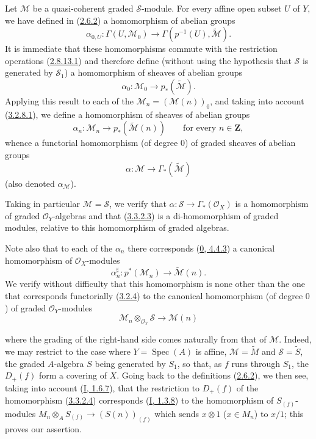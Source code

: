\begin{env}[3.3.2]
\label{II.3.3.2}
Let $\mathcal{M}$ be a quasi-coherent graded $\mathcal{S}$-module. For every
affine open subset $U$ of $Y$, we have defined in
(\hyperref[II.2.6.2]{2.6.2}) a homomorphism of abelian groups
\[
  \alpha_{0,U}:\Gamma(U,\mathcal{M}_0)
  \longrightarrow\Gamma(p^{-1}(U),\widetilde{\mathcal{M}}).
\]
It is immediate that these homomorphisms commute with the restriction
operations (\hyperref[II.2.8.13.1]{2.8.13.1}) and therefore define
(without using the hypothesis that $\mathcal{S}$ is generated by
$\mathcal{S}_1$) a homomorphism of sheaves of abelian groups
\[
\label{II.3.3.2.1}
  \alpha_0:\mathcal{M}_0\longrightarrow p_*(\widetilde{\mathcal{M}}).
\tag{3.3.2.1}
\]
Applying this result to each of the
$\mathcal{M}_n=(\mathcal{M}(n))_0$, and taking into account
(\hyperref[II.3.2.8.1]{3.2.8.1}), we define a homomorphism of sheaves of
abelian groups
\[
\label{II.3.3.2.2}
  \alpha_n:\mathcal{M}_n\longrightarrow
  p_*(\widetilde{\mathcal{M}}(n))
  \qquad\text{for every }n\in\mathbf{Z},
\tag{3.3.2.2}
\]
whence a functorial homomorphism (of degree $0$) of graded sheaves of abelian
groups
\[
\label{II.3.3.2.3}
  \alpha:\mathcal{M}\longrightarrow\Gamma_*(\widetilde{\mathcal{M}})
\tag{3.3.2.3}
\]
(also denoted $\alpha_{\mathcal{M}}$).

Taking in particular $\mathcal{M}=\mathcal{S}$, we verify that
$\alpha:\mathcal{S}\to\Gamma_*(\mathcal{O}_X)$ is a homomorphism of graded
$\mathcal{O}_Y$-algebras and that
(\hyperref[II.3.3.2.3]{3.3.2.3}) is a di-homomorphism of graded modules,
relative to this homomorphism of graded algebras.

Note also that to each of the $\alpha_n$ there corresponds
(\hyperref[0.4.4.3]{0, 4.4.3}) a canonical homomorphism of
$\mathcal{O}_X$-modules
\[
\label{II.3.3.2.4}
  \alpha_n^\sharp:p^*(\mathcal{M}_n)
  \longrightarrow\widetilde{\mathcal{M}}(n).
\tag{3.3.2.4}
\]
We verify without difficulty that this homomorphism is none other than the
one that corresponds functorially (\hyperref[II.3.2.4]{3.2.4}) to the
canonical homomorphism (of degree $0$) of graded $\mathcal{O}_Y$-modules
\[
\label{II.3.3.2.5}
  \mathcal{M}_n\otimes_{\mathcal{O}_Y}\mathcal{S}
  \longrightarrow\mathcal{M}(n)
\tag{3.3.2.5}
\]


where the grading of the right-hand side comes naturally from that of
$\mathcal{M}$. Indeed, we may restrict to the case where
$Y=\operatorname{Spec}(A)$ is affine, $\mathcal{M}=\widetilde{M}$ and
$\mathcal{S}=\widetilde{S}$, the graded $A$-algebra $S$ being generated by
$S_1$, so that, as $f$ runs through $S_1$, the $D_+(f)$ form a covering of
$X$. Going back to the definitions
(\hyperref[II.2.6.2]{2.6.2}), we then see, taking into account
(\hyperref[I.1.6.7]{I, 1.6.7}), that the restriction to $D_+(f)$ of
the homomorphism (\hyperref[II.3.3.2.4]{3.3.2.4}) corresponds
(\hyperref[I.1.3.8]{I, 1.3.8}) to the homomorphism of $S_{(f)}$-modules
$M_n\otimes_A S_{(f)}\to(S(n))_{(f)}$ which sends $x\otimes1$ ($x\in M_n$)
to $x/1$; this proves our assertion.
\end{env}

